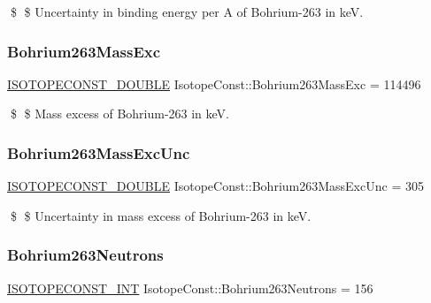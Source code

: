 \$ \$ Uncertainty in binding energy per A of Bohrium-\/263 in keV. \mbox{\label{group___isotope_const-_bohrium-_bh263_gabc855dd410f304a103fd7f09513dd2cd}} 
\subsubsection{\texorpdfstring{Bohrium263\+Mass\+Exc}{Bohrium263MassExc}}
{\footnotesize\ttfamily \mbox{\hyperlink{group___isotope_const-_macros_ga8f45a7272ce02c0b4c65c44636ed719a}{I\+S\+O\+T\+O\+P\+E\+C\+O\+N\+S\+T\+\_\+\+D\+O\+U\+B\+LE}} Isotope\+Const\+::\+Bohrium263\+Mass\+Exc = 114496}

\$ \$ Mass excess of Bohrium-\/263 in keV. \mbox{\label{group___isotope_const-_bohrium-_bh263_ga3e44432285e968b252f8b683de67c250}} 
\subsubsection{\texorpdfstring{Bohrium263\+Mass\+Exc\+Unc}{Bohrium263MassExcUnc}}
{\footnotesize\ttfamily \mbox{\hyperlink{group___isotope_const-_macros_ga8f45a7272ce02c0b4c65c44636ed719a}{I\+S\+O\+T\+O\+P\+E\+C\+O\+N\+S\+T\+\_\+\+D\+O\+U\+B\+LE}} Isotope\+Const\+::\+Bohrium263\+Mass\+Exc\+Unc = 305}

\$ \$ Uncertainty in mass excess of Bohrium-\/263 in keV. \mbox{\label{group___isotope_const-_bohrium-_bh263_gabe146e083f2eaa5c4b29826724b8ebb7}} 
\subsubsection{\texorpdfstring{Bohrium263\+Neutrons}{Bohrium263Neutrons}}
{\footnotesize\ttfamily \mbox{\hyperlink{group___isotope_const-_macros_ga5f18360b3e99483a35c32d789e62621c}{I\+S\+O\+T\+O\+P\+E\+C\+O\+N\+S\+T\+\_\+\+I\+NT}} Isotope\+Const\+::\+Bohrium263\+Neutrons = 156}

